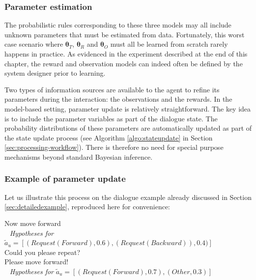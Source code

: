 \subsubsection*{Parameter estimation}
The probabilistic rules corresponding to these three models may all include unknown parameters that must be estimated from data.  Fortunately, this worst case scenario where $\boldsymbol\theta_T$, $\boldsymbol\theta_R$ and $\boldsymbol\theta_O$ must all be learned from scratch rarely happens in practice. As evidenced in the experiment described at the end of this chapter, the reward and observation models can indeed often be defined by the system designer prior to learning. 

Two types of information sources are available to the agent to refine its parameters during the interaction: the observations and the rewards.  In the model-based setting, parameter update is relatively straightforward.  The key idea is to include the parameter variables as part of the dialogue state.  The probability distributions of these parameters are automatically updated as part of the state update process (see Algorithm \ref{algo:stateupdate} in Section \ref{sec:processing-workflow}). There is therefore no need for special purpose mechanisms beyond standard Bayesian inference.

\subsubsection*{Example of parameter update}

Let us illustrate this process on the dialogue example already discussed in Section \ref{sec:detailedexample}, reproduced here for convenience: \vspace{-2mm}
\begin{dialogue} 
 Now move forward \\  $\phantom{b}$ \textit{Hypotheses for} $\tilde{a}_u = [ (\mathit{Request(Forward)}, 0.6), (\mathit{Request(Backward)}), 0.4)]$  \\[-3mm]
 Could you please repeat? \\[-3mm]
 Please move forward! \\  $\phantom{b}$ \textit{Hypotheses for} $\tilde{a}_u = [ (\mathit{Request(Forward)}, 0.7), (\mathit{Other}, 0.3) ]$ \\[-4mm]
\end{dialogue} 

